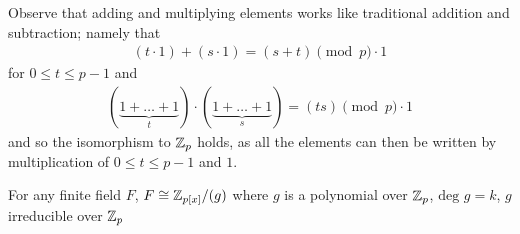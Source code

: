 \documentclass{memoir}
\begin{document}
Observe that adding and multiplying elements works like traditional addition and subtraction; namely that
\begin{align*}
(t\cdot 1)+(s\cdot 1) = (s+t) \pmod p \cdot 1
\end{align*}
for \(0\leq t\leq p-1\) and
\begin{align*}
	(\underbrace{1+\ldots+1}_t)\cdot (\underbrace{1+\ldots+1}_s) = ( ts) \pmod p \cdot 1
\end{align*}
and so the isomorphism to \(\mathbb{Z}_p\) holds, as all the elements can then be written by multiplication of \(0\leq t\leq p-1\) and \(1\).
\begin{thm}
	For any finite field \(F\), \(F \cong \mathbb{Z}_{p[x]} / (g)\) where \(g\) is a polynomial over \(\mathbb{Z}_p\), \( \textrm{deg }g = k\), \(g\) irreducible over \(\mathbb{Z}_p\)
\end{thm}
\end{document}
